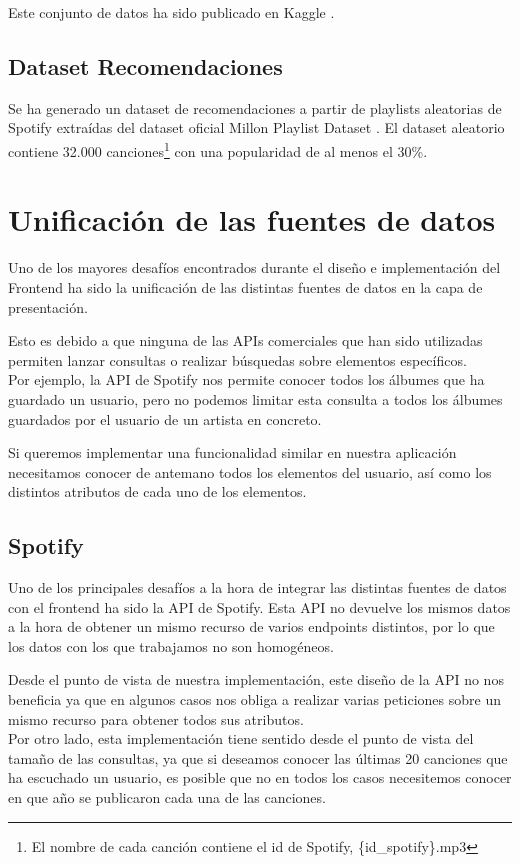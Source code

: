 Este conjunto de datos ha sido publicado en Kaggle \cite{LudwigMu18:online}. 

\subsection{Dataset Recomendaciones}\label{dataset_similitud}
Se ha generado un dataset de recomendaciones a partir de playlists aleatorias de Spotify extraídas del dataset oficial Millon Playlist Dataset \cite{million_playlist_dataset}. El dataset aleatorio contiene 32.000 canciones\footnote{El nombre de cada canción contiene el id de Spotify, \{id\_spotify\}.mp3} con una popularidad de al menos el 30\%.


\section{Unificación de las fuentes de
datos}\label{unificacion-de-las-fuentes-de-datos}
Uno de los mayores desafíos encontrados durante el diseño e implementación del
Frontend ha sido la unificación de las distintas fuentes de datos en la capa de presentación.

Esto es debido a que ninguna de las APIs comerciales que han sido
utilizadas permiten lanzar consultas o realizar búsquedas sobre
elementos específicos.\\
Por ejemplo, la API de Spotify nos permite conocer todos los álbumes que
ha guardado un usuario, pero no podemos limitar esta consulta a todos
los álbumes guardados por el usuario de un artista en concreto.

Si queremos implementar una funcionalidad similar en nuestra aplicación
necesitamos conocer de antemano todos los elementos del usuario, así
como los distintos atributos de cada uno de los elementos.


\subsection{Spotify}\label{spotify}

Uno de los principales desafíos a la hora de integrar las distintas
fuentes de datos con el frontend ha sido la API de Spotify. Esta API no
devuelve los mismos datos a la hora de obtener un mismo recurso de
varios endpoints distintos, por lo que los datos con los que trabajamos
no son homogéneos.

Desde el punto de vista de nuestra implementación, este diseño de la API
no nos beneficia ya que en algunos casos nos obliga a realizar varias
peticiones sobre un mismo recurso para obtener todos sus atributos.\\
Por otro lado, esta implementación tiene sentido desde el punto de vista
del tamaño de las consultas, ya que si deseamos conocer las últimas 20
canciones que ha escuchado un usuario, es posible que no en todos los
casos necesitemos conocer en que año se publicaron cada una de las
canciones.

